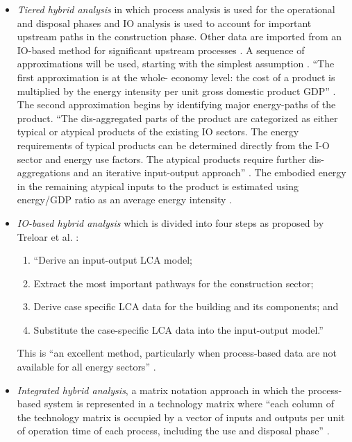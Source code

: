 \documentclass[10pt]{article}
\begin{document}
\begin{itemize}
  \item {\color{blue}\textit{Tiered hybrid analysis} in which process analysis is used for the operational and disposal phases and IO analysis is used to account for important upstream paths in the construction phase.} Other data are imported from an IO-based method for significant upstream processes \cite{suh2005methods}.   A sequence of approximations will be used, starting with the simplest assumption \cite{bullard1978net}. {\color{blue}``The first approximation is at the whole- economy level: the cost of a product is multiplied by the energy intensity per unit gross domestic product GDP''} \cite{bilec2006example}. The second approximation begins by identifying major energy-paths of the product. {\color{blue}``The dis-aggregated parts of the product are categorized as either typical or atypical products of the existing IO sectors. The energy requirements of typical products can be determined directly from the I-O sector and energy use factors. The atypical products require further dis-aggregations and an iterative input-output approach''} \cite{bilec2006example}. The embodied energy in the remaining atypical inputs to the product is estimated using energy/GDP ratio as an average energy intensity \cite{bullard1978net}.

  \item \textit{IO-based hybrid analysis} which is divided into four steps as proposed by Treloar et al. \cite{treloar2000hybrid}: 
  
  \begin{enumerate}
      \item ``Derive an input-output LCA model;
      \item Extract the most important pathways for the construction sector;
      \item Derive case specific LCA data for the building and its components; and
   \item Substitute the case-specific LCA data into the input-output model.'' \cite{treloar2000hybrid}
  \end{enumerate}
  
  This is ``an  excellent method, particularly when process-based data are not available for all energy sectors'' \cite{dixit2017embodied}.


\item {\color{blue}\textit{Integrated  hybrid  analysis}}, a matrix notation approach in which the process-based system is represented 
in a technology matrix where ``each column of the  technology matrix is occupied  by  a  vector  of  inputs  and  outputs  per  unit  of operation time of each process, including the use and disposal phase'' 
\cite{suh2004system}. %

\end{itemize}
\end{document}
